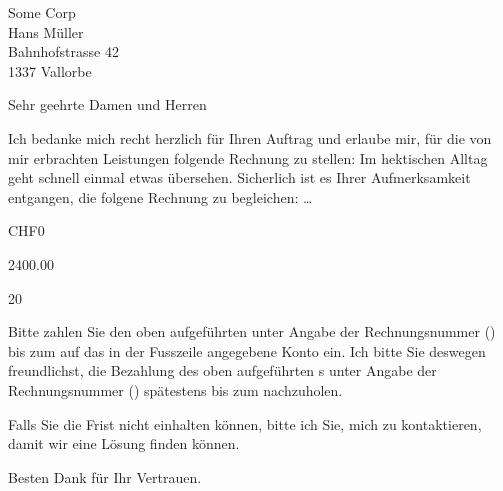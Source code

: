 \documentclass[DIN,SN,10pt,DIV=16,_rechnung]{scrlttr2}
\begin{document}
  \begin{letter}{
      Some Corp \\
      Hans Müller \\
      Bahnhofstrasse 42 \\
      1337 Vallorbe
    }

    \opening{Sehr geehrte Damen und Herren}
    \thispagestyle{plain}

    \ifnum{}
      Ich bedanke mich recht herzlich für Ihren Auftrag und erlaube mir, für die
      von mir erbrachten Leistungen folgende Rechnung zu stellen:
    \else
      \ifnum{}
        Im hektischen Alltag geht schnell einmal etwas übersehen.
        Sicherlich ist es Ihrer Aufmerksamkeit entgangen, die folgene Rechnung zu begleichen:
      \else
        \dots
      \fi
    \fi

    \renewcommand{\arraystretch}{1.2}

    \begin{invoice}{CHF}{0}

       {2400.00}
      \STExpenses


       {20}

    \end{invoice}

    \begin{samepage}
      \ifnum{}
        Bitte zahlen Sie den oben aufgeführten {\Total} unter Angabe der
        Rechnungsnummer () bis zum  auf
        das in der Fusszeile angegebene Konto ein.
      \else
        Ich bitte Sie deswegen freundlichst, die Bezahlung des oben aufgeführten
        {\Total}s unter Angabe der Rechnungsnummer () spätestens
        bis zum  nachzuholen.

        Falls Sie die Frist nicht einhalten können, bitte ich Sie, mich zu
        kontaktieren, damit wir eine Lösung finden können.
      \fi

      \closing{Besten Dank für Ihr Vertrauen.}

    \end{samepage}
  \end{letter}
\end{document}
